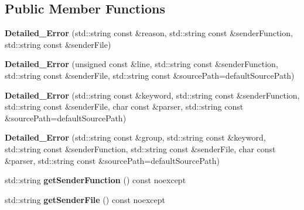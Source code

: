 \subsection*{Public Member Functions}
\begin{DoxyCompactItemize}
\item 
\hypertarget{classstb_1_1Detailed__Error_aa2f7bef037522911686074af177a1b2e}{{\bfseries Detailed\+\_\+\+Error} (std\+::string const \&reason, std\+::string const \&sender\+Function, std\+::string const \&sender\+File)}\label{classstb_1_1Detailed__Error_aa2f7bef037522911686074af177a1b2e}

\item 
\hypertarget{classstb_1_1Detailed__Error_a11aa9746641ab31038e8331f306c35db}{{\bfseries Detailed\+\_\+\+Error} (unsigned const \&line, std\+::string const \&sender\+Function, std\+::string const \&sender\+File, std\+::string const \&source\+Path=default\+Source\+Path)}\label{classstb_1_1Detailed__Error_a11aa9746641ab31038e8331f306c35db}

\item 
\hypertarget{classstb_1_1Detailed__Error_a5d77a05af6c6799e2acce4bd76c3ac64}{{\bfseries Detailed\+\_\+\+Error} (std\+::string const \&keyword, std\+::string const \&sender\+Function, std\+::string const \&sender\+File, char const \&parser, std\+::string const \&source\+Path=default\+Source\+Path)}\label{classstb_1_1Detailed__Error_a5d77a05af6c6799e2acce4bd76c3ac64}

\item 
\hypertarget{classstb_1_1Detailed__Error_a62c01198ec65c746e86e5c54017c1fd7}{{\bfseries Detailed\+\_\+\+Error} (std\+::string const \&group, std\+::string const \&keyword, std\+::string const \&sender\+Function, std\+::string const \&sender\+File, char const \&parser, std\+::string const \&source\+Path=default\+Source\+Path)}\label{classstb_1_1Detailed__Error_a62c01198ec65c746e86e5c54017c1fd7}

\item 
\hypertarget{classstb_1_1Detailed__Error_aee1d6ba4aecc4a99eadce97f32092750}{std\+::string {\bfseries get\+Sender\+Function} () const noexcept}\label{classstb_1_1Detailed__Error_aee1d6ba4aecc4a99eadce97f32092750}

\item 
\hypertarget{classstb_1_1Detailed__Error_aaa4e857896068810b71e82b016862d62}{std\+::string {\bfseries get\+Sender\+File} () const noexcept}\label{classstb_1_1Detailed__Error_aaa4e857896068810b71e82b016862d62}

\end{DoxyCompactItemize}
